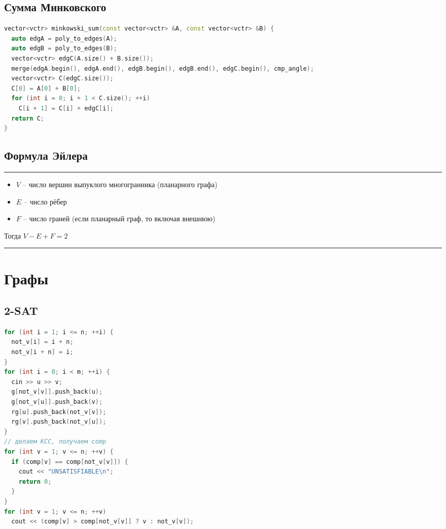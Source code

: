 \documentclass[10pt,a4paper,landscape,twosided]{extarticle}
\begin{document}
\begin{multicols*}{3}
\begin{lstlisting}[language=C++]
\end{lstlisting}

\subsection{Сумма Минковского}
\begin{lstlisting}[language=C++]
vector<vctr> minkowski_sum(const vector<vctr> &A, const vector<vctr> &B) {
  auto edgA = poly_to_edges(A);
  auto edgB = poly_to_edges(B);
  vector<vctr> edgC(A.size() + B.size());
  merge(edgA.begin(), edgA.end(), edgB.begin(), edgB.end(), edgC.begin(), cmp_angle);
  vector<vctr> C(edgC.size());
  C[0] = A[0] + B[0];
  for (int i = 0; i + 1 < C.size(); ++i)
    C[i + 1] = C[i] + edgC[i];
  return C;
}

\end{lstlisting}

\subsection{Формула Эйлера}
\noindent\rule{\linewidth}{0.15mm}
\begin{itemize}
    \item $V$ -- число вершин выпуклого многогранника (планарного графа)
    \item $E$ -- число рёбер
    \item $F$ -- число граней (если планарный граф, то включая внешнюю)
\end{itemize}
Тогда $V-E+F=2$

\noindent\rule{\linewidth}{0.15mm}

\section{Графы}

\subsection{2-SAT}
\begin{lstlisting}[language=C++]
for (int i = 1; i <= n; ++i) {
  not_v[i] = i + n;
  not_v[i + n] = i;
}
for (int i = 0; i < m; ++i) {
  cin >> u >> v;
  g[not_v[v]].push_back(u);
  g[not_v[u]].push_back(v);
  rg[u].push_back(not_v[v]);
  rg[v].push_back(not_v[u]);
}
// делаем КСС, получаем comp
for (int v = 1; v <= n; ++v) {
  if (comp[v] == comp[not_v[v]]) {
    cout << "UNSATISFIABLE\n";
    return 0;
  }
}
for (int v = 1; v <= n; ++v)
  cout << (comp[v] > comp[not_v[v]] ? v : not_v[v]);
\end{lstlisting}


\end{multicols*}
\end{document}
